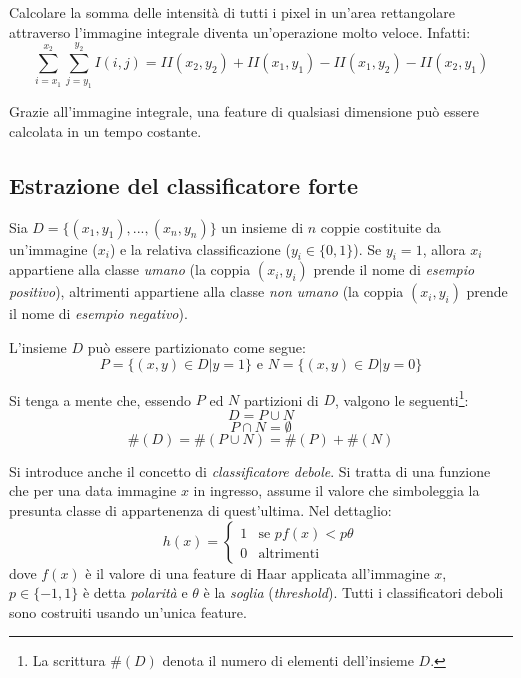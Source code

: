 Calcolare la somma delle intensità di tutti i pixel in un'area rettangolare attraverso l'immagine integrale diventa un'operazione molto veloce.
Infatti: $$ \sum_{i = x_1}^{x_2} \sum_{j = y_1}^{y_2} I(i,j) =
II(x_2, y_2) + II(x_1, y_1) - II(x_1, y_2) - II(x_2, y_1)$$

Grazie all'immagine integrale, una feature di qualsiasi dimensione può essere calcolata in un tempo costante.


\subsection{Estrazione del classificatore forte} %
\label{sub:estrazione_del_classificatore_forte}
Sia $D = \{(x_1, y_1), ..., (x_n, y_n)\}$ un insieme di $n$ coppie costituite da un'immagine ($x_i$) e la relativa classificazione ($y_i \in \{ 0, 1 \}$). Se $y_i = 1$, allora $x_i$ appartiene alla classe \emph{umano} (la coppia $(x_i, y_i)$ prende il nome di \emph{esempio positivo}), altrimenti appartiene alla classe \emph{non umano} (la coppia $(x_i, y_i)$ prende il nome di \emph{esempio negativo}).

L'insieme $D$ può essere partizionato come segue:
$$P = \{(x, y) \in D | y = 1\} \text{ e } N = \{(x,y) \in D | y = 0\}$$

Si tenga a mente che, essendo $P$ ed $N$ partizioni di $D$, valgono le seguenti\footnote{La scrittura $\#(D)$ denota il numero di elementi dell'insieme $D$.}:
\begin{equation}
    D = P \cup N
\end{equation}
\begin{equation}
    P \cap N = \emptyset
\end{equation}
\begin{equation}
    \#(D) = \#(P \cup N) = \#(P) + \#(N)
\end{equation}

Si introduce anche il concetto di \emph{classificatore debole}. Si tratta di una funzione che per una data immagine $x$ in ingresso, assume il valore che simboleggia la presunta classe di appartenenza di quest'ultima.
Nel dettaglio:
\begin{equation}
    h(x) = \begin{cases}
    1 & \text{se $pf(x) < p\theta$}\\
    0 & \text{altrimenti}
\end{cases}
\end{equation}
dove $f(x)$ è il valore di una feature di Haar applicata all'immagine $x$, $p \in \{-1,1\}$ è detta \emph{polarità} e $\theta$ è la \emph{soglia} (\emph{threshold}). Tutti i classificatori deboli sono costruiti usando un'unica feature.

